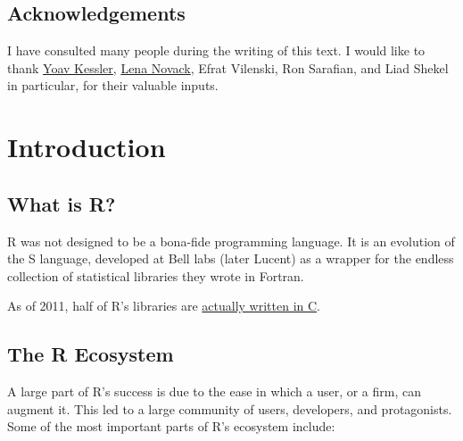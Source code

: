 \documentclass[]{book}
\theoremstyle{definition}
\theoremstyle{definition}
\theoremstyle{definition}
\theoremstyle{remark}
\begin{document}
\section{Acknowledgements}\label{acknowledgements}

I have consulted many people during the writing of this text. I would
like to thank \href{https://kesslerlab.wordpress.com/}{Yoav Kessler},
\href{http://fohs.bgu.ac.il/research/profileBrief.aspx?id=VeeMVried}{Lena
Novack}, Efrat Vilenski, Ron Sarafian, and Liad Shekel in particular,
for their valuable inputs.

\chapter{Introduction}\label{intro}

\section{What is R?}\label{what-r}

R was not designed to be a bona-fide programming language. It is an
evolution of the S language, developed at Bell labs (later Lucent) as a
wrapper for the endless collection of statistical libraries they wrote
in Fortran.

As of 2011, half of R's libraries are
\href{https://wrathematics.github.io/2011/08/27/how-much-of-r-is-written-in-r/}{actually
written in C}.

\hypertarget{ecosystem}{\section{The R Ecosystem}\label{ecosystem}}

A large part of R's success is due to the ease in which a user, or a
firm, can augment it. This led to a large community of users,
developers, and protagonists. Some of the most important parts of R's
ecosystem include:
\end{document}

